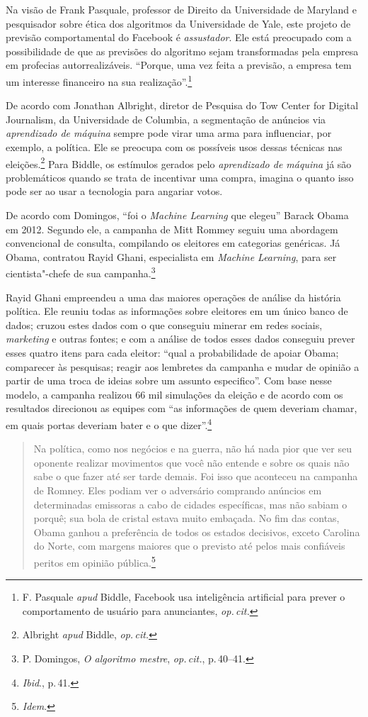 Na visão de Frank Pasquale, professor de Direito da Universidade de
Maryland e pesquisador sobre ética dos algoritmos da Universidade de
Yale, este projeto de previsão comportamental do Facebook é
\textit{assustador}. Ele está preocupado com a possibilidade de que as
previsões do algoritmo sejam transformadas pela empresa em profecias
autorrealizáveis. ``Porque, uma vez feita a previsão, a empresa tem um
interesse financeiro na sua realização''.\footnote{F. Pasquale \textit{apud} Biddle, Facebook usa inteligência artificial para prever o
comportamento de usuário para anunciantes, \textit{op.\,cit.}}

De acordo com Jonathan Albright, diretor de Pesquisa do Tow Center for
Digital Journalism, da Universidade de Columbia, a segmentação de
anúncios via \textit{aprendizado de máquina} sempre pode virar uma arma para
influenciar, por exemplo, a política. Ele se preocupa com os possíveis
usos dessas técnicas nas eleições.\footnote{Albright \textit{apud} Biddle, \textit{op.\,cit.}}
Para Biddle, os estímulos gerados pelo \textit{aprendizado de máquina} já
são problemáticos quando se trata de incentivar uma compra, imagina o
quanto isso pode ser ao usar a tecnologia para angariar votos.

De acordo com Domingos, ``foi o \textit{Machine Learning} que
elegeu'' Barack Obama em 2012. Segundo ele, a campanha de Mitt Rommey
seguiu uma abordagem convencional de consulta, compilando os
eleitores em categorias genéricas. Já Obama, contratou Rayid Ghani,
especialista em \textit{Machine Learning}, para ser cientista"-chefe de sua
campanha.\footnote{P. Domingos, \textit{O algoritmo mestre}, \textit{op.\,cit.}, p.\,40--41.}

Rayid Ghani empreendeu a uma das maiores operações de análise da
história política. Ele reuniu todas as informações sobre eleitores em
um único banco de dados; cruzou estes dados com o que conseguiu minerar
em redes sociais, \textit{marketing} e outras fontes; e com a análise de todos
esses dados conseguiu prever esses quatro itens para cada eleitor:
``qual a probabilidade de apoiar Obama; comparecer às pesquisas; reagir
aos lembretes da campanha e mudar de opinião a partir de uma troca de
ideias sobre um assunto especifico''. Com base nesse modelo, a campanha
realizou 66 mil simulações da eleição e de acordo com os resultados
direcionou as equipes com ``as informações de quem deveriam chamar, em
quais portas deveriam bater e o que dizer''.\footnote{\textit{Ibid}., p.\,41.}

\begin{quote}
Na política, como nos negócios e na guerra, não há nada pior que ver seu
oponente realizar movimentos que você não entende e sobre os quais não
sabe o que fazer até ser tarde demais. Foi isso que aconteceu na
campanha de Romney. Eles podiam ver o adversário comprando anúncios em
determinadas emissoras a cabo de cidades específicas, mas não sabiam o
porquê; sua bola de cristal estava muito embaçada. No fim das contas,
Obama ganhou a preferência de todos os estados decisivos, exceto
Carolina do Norte, com margens maiores que o previsto até pelos mais
confiáveis peritos em opinião pública.\footnote{\textit{Idem}.}
\end{quote}

